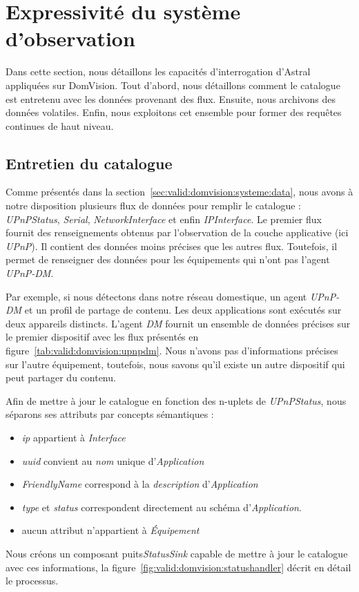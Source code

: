 \section{Expressivité du système d'observation}\label{sec:valid:domvision:requetes}
Dans cette section, nous détaillons les capacités d'interrogation d'Astral appliquées sur DomVision. Tout d'abord, nous détaillons comment le catalogue est entretenu avec les données provenant des flux. Ensuite, nous archivons des données volatiles. Enfin, nous exploitons cet ensemble pour former des requêtes continues de haut niveau.

\subsection{Entretien du catalogue}
Comme présentés dans la section~\ref{sec:valid:domvision:systeme:data}, nous avons à notre disposition plusieurs flux de données pour remplir le catalogue : \textit{UPnPStatus}, \textit{Serial}, \textit{NetworkInterface} et enfin \textit{IPInterface}. Le premier flux fournit des renseignements obtenus par l'observation de la couche applicative (ici \textit{UPnP}). Il contient des données moins précises que les autres flux. Toutefois, il permet de renseigner des données pour les équipements qui n'ont pas l'agent \textit{UPnP-DM}.

Par exemple, si nous détectons dans notre réseau domestique, un agent \textit{UPnP-DM} et un profil de partage de contenu. Les deux applications sont exécutés sur deux appareils distincts. L'agent \textit{DM} fournit un ensemble de données précises sur le premier dispositif avec les flux présentés en figure~\ref{tab:valid:domvision:upnpdm}. Nous n'avons pas d'informations précises sur l'autre équipement, toutefois, nous savons qu'il existe un autre dispositif qui peut partager du contenu.

Afin de mettre à jour le catalogue en fonction des n-uplets de \textit{UPnPStatus}, nous séparons ses attributs par concepts sémantiques :
\begin{itemize}
\item \textit{ip} appartient à \textit{Interface}
\item \textit{uuid} convient au \textit{nom} unique d'\textit{Application}
\item \textit{FriendlyName} correspond à la \textit{description} d'\textit{Application}
\item \textit{type} et \textit{status} correspondent directement au schéma d'\textit{Application}.
\item aucun attribut n'appartient à \textit{Équipement}
\end{itemize}
Nous créons un composant puits\textit{StatusSink} capable de mettre à jour le catalogue avec ces informations, la figure~\ref{fig:valid:domvision:statushandler} décrit en détail le processus.

